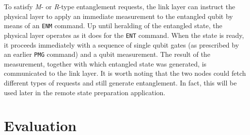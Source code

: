 To satisfy \emph{M}- or \emph{R}-type entanglement requests, the link layer can instruct the
physical layer to apply an immediate measurement to the entangled qubit by means of an \texttt{ENM}
command. Up until heralding of the entangled state, the physical layer operates as it does for the
\texttt{ENT} command. When the state is ready, it proceeds immediately with a sequence of single
qubit gates (as prescribed by an earlier \texttt{PMG} command) and a qubit measurement. The result
of the measurement, together with which entangled state was generated, is communicated to the link
layer. It is worth noting that the two nodes could fetch different types of requests and still
generate entanglement. In fact, this will be used later in the remote state preparation application.

\section{Evaluation}
\label{sec:netstack:eval}

